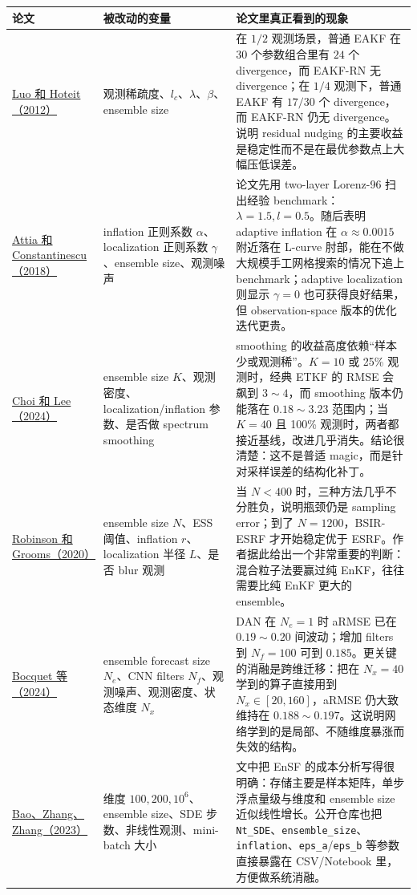 \documentclass[12pt,a4paper]{ctexart}
\begin{document}
\begin{longtable}{>{\raggedright\arraybackslash}p{3.2cm} >{\raggedright\arraybackslash}p{3.8cm} >{\raggedright\arraybackslash}p{6.4cm}}
\toprule
论文 & 被改动的变量 & 论文里真正看到的现象 \\
\midrule
\endhead
\href{https://arxiv.org/abs/1210.1318}{Luo 和 Hoteit（2012）} & 观测稀疏度、\(l_c\)、\(\lambda\)、\(\beta\)、ensemble size & 在 \(1/2\) 观测场景，普通 EAKF 在 \(30\) 个参数组合里有 \(24\) 个 divergence，而 EAKF-RN 无 divergence；在 \(1/4\) 观测下，普通 EAKF 有 \(17/30\) 个 divergence，而 EAKF-RN 仍无 divergence。说明 residual nudging 的主要收益是稳定性而不是在最优参数点上大幅压低误差。 \\
\href{https://arxiv.org/abs/1806.10655}{Attia 和 Constantinescu（2018）} & inflation 正则系数 \(\alpha\)、localization 正则系数 \(\gamma\)、ensemble size、观测噪声 & 论文先用 two-layer Lorenz-96 扫出经验 benchmark：\(\lambda=1.5, l=0.5\)。随后表明 adaptive inflation 在 \(\alpha \approx 0.0015\) 附近落在 L-curve 肘部，能在不做大规模手工网格搜索的情况下追上 benchmark；adaptive localization 则显示 \(\gamma=0\) 也可获得良好结果，但 observation-space 版本的优化迭代更贵。 \\
\href{https://arxiv.org/abs/2404.00154}{Choi 和 Lee（2024）} & ensemble size \(K\)、观测密度、localization/inflation 参数、是否做 spectrum smoothing & smoothing 的收益高度依赖“样本少或观测稀”。\(K=10\) 或 25\% 观测时，经典 ETKF 的 RMSE 会飙到 \(3\!\sim\!4\)，而 smoothing 版本仍能落在 \(0.18\!\sim\!3.23\) 范围内；当 \(K=40\) 且 100\% 观测时，两者都接近基线，改进几乎消失。结论很清楚：这不是普适 magic，而是针对采样误差的结构化补丁。 \\
\href{https://arxiv.org/abs/2006.04699}{Robinson 和 Grooms（2020）} & ensemble size \(N\)、ESS 阈值、inflation \(r\)、localization 半径 \(L\)、是否 blur 观测 & 当 \(N<400\) 时，三种方法几乎不分胜负，说明瓶颈仍是 sampling error；到了 \(N=1200\)，BSIR-ESRF 才开始稳定优于 ESRF。作者据此给出一个非常重要的判断：混合粒子法要赢过纯 EnKF，往往需要比纯 EnKF 更大的 ensemble。 \\
\href{https://arxiv.org/abs/2408.04739}{Bocquet 等（2024）} & ensemble forecast size \(N_e\)、CNN filters \(N_f\)、观测噪声、观测密度、状态维度 \(N_x\) & DAN 在 \(N_e=1\) 时 aRMSE 已在 \(0.19\!\sim\!0.20\) 间波动；增加 filters 到 \(N_f=100\) 可到 \(0.185\)。更关键的消融是跨维迁移：把在 \(N_x=40\) 学到的算子直接用到 \(N_x \in [20,160]\)，aRMSE 仍大致维持在 \(0.188\!\sim\!0.197\)。这说明网络学到的是局部、不随维度暴涨而失效的结构。 \\
\href{https://arxiv.org/abs/2309.00983}{Bao、Zhang、Zhang（2023）} & 维度 \(100,200,10^6\)、ensemble size、SDE 步数、非线性观测、mini-batch 大小 & 文中把 EnSF 的成本分析写得很明确：存储主要是样本矩阵，单步浮点量级与维度和 ensemble size 近似线性增长。公开仓库也把 \texttt{Nt\_SDE}、\texttt{ensemble\_size}、\texttt{inflation}、\texttt{eps\_a}/\texttt{eps\_b} 等参数直接暴露在 CSV/Notebook 里，方便做系统消融。 \\
\bottomrule
\end{longtable}
\end{document}
